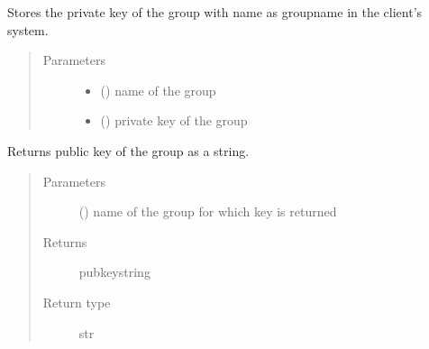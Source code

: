 \documentclass[letterpaper,10pt,english]{sphinxmanual}
\begin{document}

\begin{fulllineitems}
\label{\detokenize{grpencrypt:grpencrypt.private_key_storing}}
Stores the private key of the group with name as groupname in the client’s system.
\begin{quote}\begin{description}
\item[{Parameters}] \leavevmode\begin{itemize}
\item {} 
 () \textendash{} name of the group

\item {} 
 () \textendash{} private key of the group

\end{itemize}

\end{description}\end{quote}

\end{fulllineitems}


\begin{fulllineitems}
\label{\detokenize{grpencrypt:grpencrypt.public_key_getting}}
Returns public key of the group as a string.
\begin{quote}\begin{description}
\item[{Parameters}] \leavevmode
{} () \textendash{} name of the group for which key is returned

\item[{Returns}] \leavevmode
pubkeystring

\item[{Return type}] \leavevmode
str

\end{description}\end{quote}

\end{fulllineitems}
\end{document}
